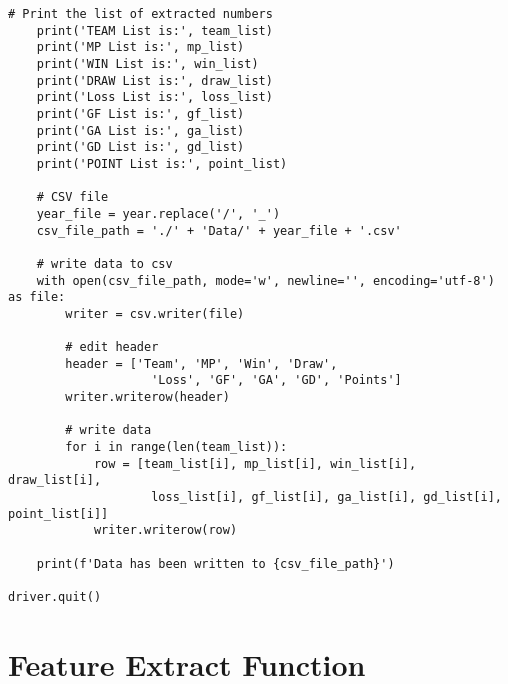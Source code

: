 \begin{lstlisting}[style=pystyle]
    # Print the list of extracted numbers
    print('TEAM List is:', team_list)
    print('MP List is:', mp_list)
    print('WIN List is:', win_list)
    print('DRAW List is:', draw_list)
    print('Loss List is:', loss_list)
    print('GF List is:', gf_list)
    print('GA List is:', ga_list)
    print('GD List is:', gd_list)
    print('POINT List is:', point_list)

    # CSV file
    year_file = year.replace('/', '_')
    csv_file_path = './' + 'Data/' + year_file + '.csv'

    # write data to csv
    with open(csv_file_path, mode='w', newline='', encoding='utf-8') as file:
        writer = csv.writer(file)

        # edit header
        header = ['Team', 'MP', 'Win', 'Draw',
                    'Loss', 'GF', 'GA', 'GD', 'Points']
        writer.writerow(header)

        # write data
        for i in range(len(team_list)):
            row = [team_list[i], mp_list[i], win_list[i], draw_list[i],
                    loss_list[i], gf_list[i], ga_list[i], gd_list[i], point_list[i]]
            writer.writerow(row)

    print(f'Data has been written to {csv_file_path}')

driver.quit()

\end{lstlisting}
% 
% 
% 
% 
\section{Feature Extract Function}\label{sec:FEF}
% 
% 
